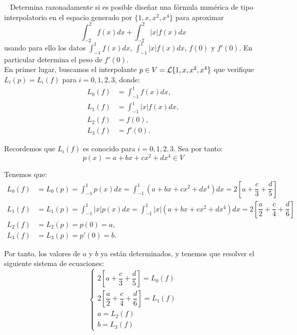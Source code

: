\begin{ejercicio}~\label{ej:2.3.2}
    Determina razonadamente si es posible diseñar una fórmula numérica de tipo interpolatorio en el espacio generado por $\{1, x, x^2, x^4\}$ para aproximar
    \begin{equation*}
        \int_{-2}^{2} f(x) dx + \int_{-2}^{2} |x|f(x) dx
    \end{equation*}
    usando para ello los datos $\int_{-1}^{1} f(x) dx$, $\int_{-1}^{1} |x|f(x) dx$, $f(0)$ y $f'(0)$. En particular determina el peso de $f'(0)$.\\


    En primer lugar, buscamos el interpolante $p\in V=\mathcal{L}\{1,x,x^2,x^4\}$ que verifique $L_i(p)=L_i(f)$ para $i=0,1,2,3$, donde:
    \begin{align*}
        L_0(f) &= \int_{-1}^{1} f(x)dx,\\
        L_1(f) &= \int_{-1}^{1} |x|f(x)dx,\\
        L_2(f) &= f(0),\\
        L_3(f) &= f'(0).
    \end{align*}

    Recordemos que $L_i(f)$ es conocido para $i=0,1,2,3$.
    Sea por tanto:
    \begin{equation*}
        p(x)=a+bx+cx^2+dx^4\in V
    \end{equation*}

    Tenemos que:
    \begin{align*}
        L_0(f) &= L_0(p) = \int_{-1}^{1} p(x)dx = \int_{-1}^{1} (a + bx + cx^2 + dx^4)dx = 2\left[a + \dfrac{c}{3} + \dfrac{d}{5}\right]\\
        L_1(f) &= L_1(p) = \int_{-1}^{1} |x|p(x)dx = \int_{-1}^{1} |x|(a + bx + cx^2 + dx^4)dx = 2\left[\dfrac{a}{2} + \dfrac{c}{4} + \dfrac{d}{6}\right]\\
        L_2(f) &= L_2(p) = p(0) = a,\\
        L_3(f) &= L_3(p) = p'(0) = b.
    \end{align*}

    Por tanto, los valores de $a$ y $b$ ya están determinados, y tenemos que resolver el siguiente sistema de ecuaciones:
    \begin{equation*}
        \begin{cases}
            2\left[a + \dfrac{c}{3} + \dfrac{d}{5}\right] = L_0(f)\\
            2\left[\dfrac{a}{2} + \dfrac{c}{4} + \dfrac{d}{6}\right] = L_1(f)\\
            a = L_2(f)\\
            b = L_3(f)
        \end{cases}
    \end{equation*}
    

\end{ejercicio}
